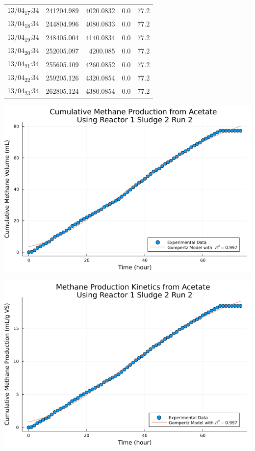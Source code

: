 \documentclass[11pt]{article}
\begin{document}
\begin{center}
\begin{tabular}{lrrrr}
13/04\textsubscript{17}:34 & 241204.989 & 4020.0832 & 0.0 & 77.2\\[0pt]
13/04\textsubscript{18}:34 & 244804.996 & 4080.0833 & 0.0 & 77.2\\[0pt]
13/04\textsubscript{19}:34 & 248405.004 & 4140.0834 & 0.0 & 77.2\\[0pt]
13/04\textsubscript{20}:34 & 252005.097 & 4200.085 & 0.0 & 77.2\\[0pt]
13/04\textsubscript{21}:34 & 255605.109 & 4260.0852 & 0.0 & 77.2\\[0pt]
13/04\textsubscript{22}:34 & 259205.126 & 4320.0854 & 0.0 & 77.2\\[0pt]
13/04\textsubscript{23}:34 & 262805.124 & 4380.0854 & 0.0 & 77.2\\[0pt]
\end{tabular}
\end{center}

\begin{center}
\includegraphics[width=.9\linewidth]{../plots/BMPs/Acetate/methane_kinetics_acet_test_1_s2_2_hour.png}
\end{center}

\begin{center}
\includegraphics[width=.9\linewidth]{../plots/BMPs/Acetate/specific_methane_kinetics_acet_test_1_s2_2_hour.png}
\end{center}
\end{document}
